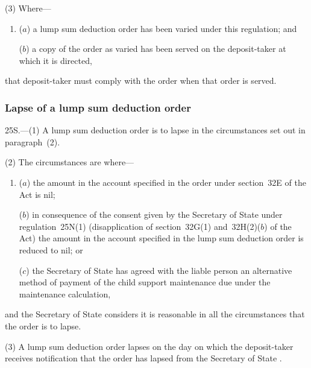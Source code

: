 \documentclass[12pt,a4paper]{article}
\begin{document}
(3) Where—
\begin{enumerate}\item[]
($a$) a lump sum deduction order has been varied under this regulation; and

($b$) a copy of the order as varied has been served on the deposit-taker at which it is directed,
\end{enumerate}
that deposit-taker must comply with the order when that order is served.


\subsubsection[25S. Lapse of a lump sum deduction order]{Lapse of a lump sum deduction order}

25S.---(1)  A lump sum deduction order is to lapse in the circumstances set out in paragraph~(2).

(2) The circumstances are where—
\begin{enumerate}\item[]
($a$) the amount in the account specified in the order under section~32E of the Act is nil;

($b$) in consequence of the consent given by the 
Secretary of State  %
under regulation~25N(1) (disapplication of section~32G(1) and~32H(2)($b$)  of the Act) the amount in the account specified in the lump sum deduction order is reduced to nil; or

($c$) the 
Secretary of State  %
has agreed with the liable person an alternative method of payment of the child support maintenance due under the maintenance calculation,
\end{enumerate}
and the 
Secretary of State  %
considers it is reasonable in all the circumstances that the order is to lapse.

(3) A lump sum deduction order lapses on the day on which the deposit-taker receives notification that the order has lapsed from the 
Secretary of State%
.
\end{document}
